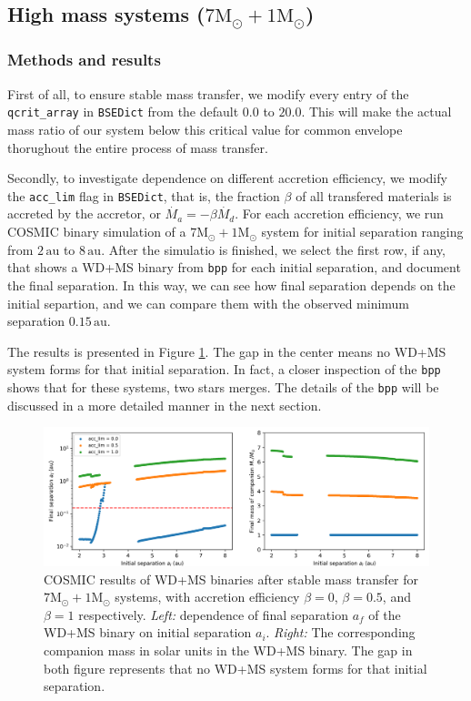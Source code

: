 \documentclass[12pt]{article}
\newcommand{\Msun}{\mathrm{M_{\odot}}}
\newcommand{\au}{\, \mathrm{au}}
\begin{document}
\subsection{High mass systems ($7\Msun + 1\Msun$)}

\subsubsection{Methods and results}
First of all, to ensure stable mass transfer, we modify every entry of the \verb|qcrit_array| in \verb|BSEDict| from the default $0.0$ to $20.0$. This will make the actual mass ratio of our system below this critical value for common envelope thorughout the entire process of mass transfer.

Secondly, to investigate dependence on different accretion efficiency, we modify the \verb|acc_lim| flag in \verb|BSEDict|, that is, the fraction $\beta$ of all transfered materials is accreted by the accretor, or $\dot{M_a} = - \beta\dot{M_d}$. For each accretion efficiency, we run COSMIC binary simulation of a $7\Msun + 1 \Msun$ system for initial separation ranging from $2 \au$ to $8 \au$. After the simulatio is finished, we select the first row, if any, that shows a WD+MS binary from \verb|bpp| for each initial separation, and document the final separation. In this way, we can see how final separation depends on the initial separtion, and we can compare them with the observed minimum separation $0.15\au$. 

The results is presented in Figure \ref{stable_hi}. The gap in the center means no WD+MS system forms for that initial separation. In fact, a closer inspection of the \verb|bpp| shows that for these systems, two stars merges. The details of the \verb|bpp| will be discussed in a more detailed manner in the next section.

\begin{figure}
    \centering
    \includegraphics[width=0.75\linewidth]{stable_hi_log.png}
    \caption{COSMIC results of WD+MS binaries after stable mass transfer for $7\Msun + 1\Msun$ systems, with accretion efficiency $\beta = 0$, $\beta = 0.5$, and $\beta = 1$ respectively. \emph{Left:} dependence of final separation $a_f$ of the WD+MS binary on initial separation $a_i$. \emph{Right:} The corresponding companion mass in solar units in the WD+MS binary. The gap in both figure represents that no WD+MS system forms for that initial separation.}
    \label{stable_hi}
\end{figure}
\end{document}
